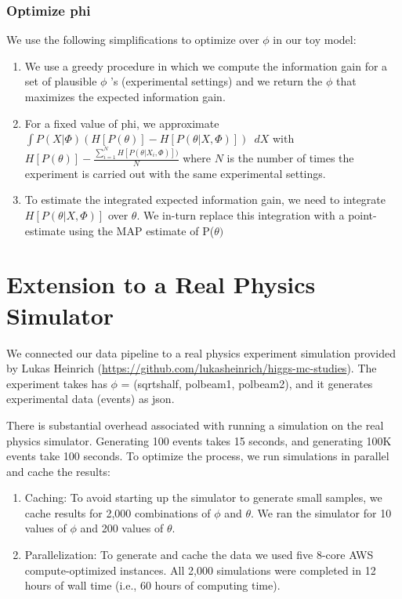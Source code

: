 \documentclass[10pt,journal,compsoc]{IEEEtran}
\begin{document}
\subsubsection{Optimize phi}
We use the following simplifications to optimize over $\phi$  in our toy model:

\begin{enumerate}
\item We use a greedy procedure in which we compute the information gain for a set of plausible $\phi$ 's (experimental settings) and we return the $\phi$ that maximizes the expected information gain.
\item  For a fixed value of phi, we approximate $\int P(X|\Phi) (H[P(\theta)]-H[P(\theta|X,\Phi)])$ $\, dX$  with $H[P(\theta)] -    \frac{\sum_{i=1}^N H[P(\theta|X_i,     \Phi)])}{N}$  where $N$ is the number of times the experiment is carried out with the same experimental settings.
\item To estimate the integrated expected information gain, we need to integrate $H[P(\theta|X,\Phi)]$  over $\theta$. We in-turn replace this integration with a point-estimate using the MAP estimate of P($\theta)$  \end{enumerate}

\section{Extension to a Real Physics Simulator}
We connected our data pipeline to a real physics experiment simulation provided by Lukas Heinrich (\url{https://github.com/lukasheinrich/higgs-mc-studies}). The experiment takes has $\phi$ = (sqrtshalf, polbeam1, polbeam2), and it generates experimental data (events) as json.

There is substantial overhead associated with running a simulation on the real physics simulator. Generating 100 events takes 15 seconds, and generating 100K events take 100 seconds. To optimize the process, we run simulations in parallel and cache the results:

\begin{enumerate}
\item Caching:  To avoid starting up the simulator to generate small samples, we cache results for 2,000 combinations of $\phi$ and $\theta$. We ran the simulator for 10 values of $\phi$ and 200 values of $\theta$.
\item Parallelization: To generate and cache the data we used five 8-core AWS compute-optimized instances. All 2,000 simulations were completed in 12 hours of wall time (i.e., 60 hours of computing time). 
\end{enumerate}
\end{document}
